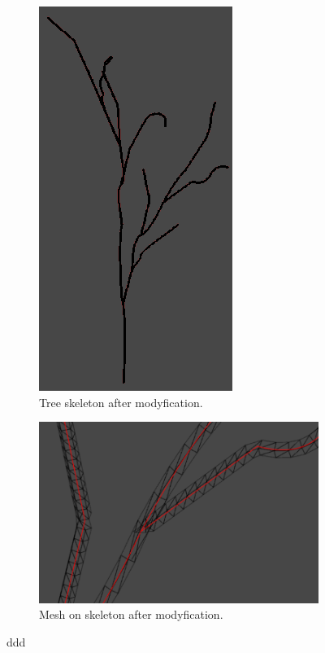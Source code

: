 \documentclass[b5paper,twoside,11pt]{article}
\begin{document}
\begin{figure}[!htbp]
\begin{subfigure}{.5\textwidth}
     \centering   
     \includegraphics[width=0.5\linewidth]{krzyweDrzewoMod} 
     \caption{Tree skeleton after modyfication. \label{unity.krzyweDrzewoMod}} 
   \end{subfigure}
\begin{subfigure}{.5\textwidth} \ContinuedFloat
  \centering  
  \includegraphics[width=1.0\linewidth]{krzyweDrzewoSiatka2} 
  \caption{Mesh on skeleton after modyfication. \label{unity.krzyweDrzewoSiatka}}
\end{subfigure} 
       \caption{ddd} \label{unity.direction} 
       \end{figure}
    \newpage
\end{document}
